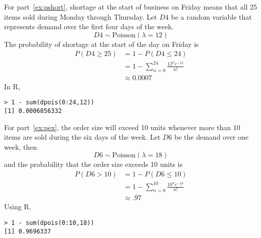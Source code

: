 \begin{enumerate}
\begin{solution}
For part~\ref{ex:pshort}, shortage at the start of business on Friday means
that all 25 items sold during Monday through Thursday. Let
$D4$ be a random variable that represents demand over the
first four days of the week.
\[ D4 \sim \text{Poisson}(\lambda = 12) \]
The probability of shortage at the start of the day on Friday is
\begin{align*}
  P(D4 \geq 25) &= 1 - P(D4 \leq 24)\\
                &= 1 - \sum_{n=0}^{24} \frac{12^n e^{-12}}{n!}\\
                &\approx 0.0007
\end{align*}
In R,
\begin{Verbatim}
> 1 - sum(dpois(0:24,12))
[1] 0.0006856332
\end{Verbatim}

For part~\ref{ex:pex}, the order size will exceed 10 units whenever more than
10 items are sold during the six days of the week. Let $D6$ be
the demand over one week, then
\[ D6 \sim \text{Poisson}(\lambda = 18) \]
and the probability that the order size exceeds 10 units is
\begin{align*}
  P(D6 > 10) &= 1 - P(D6 \leq 10) \\
             &= 1 - \sum_{n=0}^{10} \frac{18^n e^{-18}}{n!}\\
             &\approx .97
\end{align*}
Using R,
\begin{Verbatim}
> 1 - sum(dpois(0:10,18))
[1] 0.9696337
\end{Verbatim}
\end{solution}

\end{enumerate}
